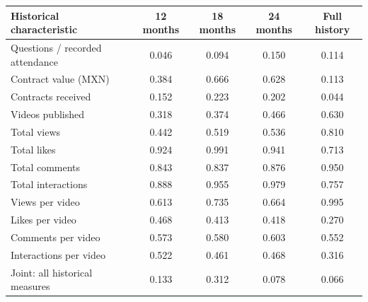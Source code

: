 \begingroup\small
\setlength{\tabcolsep}{3pt}
\renewcommand{\arraystretch}{1.25}
\noindent%
\begin{tabular*}{\linewidth}{@{\extracolsep{\fill}}lcccc@{}}
\toprule
Historical characteristic & 12 months & 18 months & 24 months & Full history \\
\midrule
Questions / recorded attendance & 0.046 & 0.094 & 0.150 & 0.114 \\
\addlinespace
Contract value (MXN) & 0.384 & 0.666 & 0.628 & 0.113 \\
Contracts received & 0.152 & 0.223 & 0.202 & 0.044 \\
\addlinespace
Videos published & 0.318 & 0.374 & 0.466 & 0.630 \\
Total views & 0.442 & 0.519 & 0.536 & 0.810 \\
Total likes & 0.924 & 0.991 & 0.941 & 0.713 \\
Total comments & 0.843 & 0.837 & 0.876 & 0.950 \\
Total interactions & 0.888 & 0.955 & 0.979 & 0.757 \\
Views per video & 0.613 & 0.735 & 0.664 & 0.995 \\
Likes per video & 0.468 & 0.413 & 0.418 & 0.270 \\
Comments per video & 0.573 & 0.580 & 0.603 & 0.552 \\
Interactions per video & 0.522 & 0.461 & 0.468 & 0.316 \\
\midrule
Joint: all historical measures & 0.133 & 0.312 & 0.078 & 0.066 \\
\bottomrule
\end{tabular*}\par\endgroup
